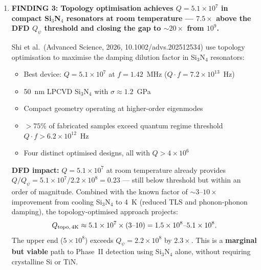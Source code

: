 \documentclass[11pt]{article}
\theoremstyle{definition}
\theoremstyle{remark}
\newcommand{\ee}[1]{\times 10^{#1}}
\newcommand{\Qpsi}{Q_\psi}
\newcommand{\caution}[1]{\textcolor{orange}{\textbf{CAUTION:} #1}}
\newcommand{\newfinding}[1]{\textcolor{teal}{\textbf{NEW FINDING:} #1}}
\begin{document}
\begin{tcolorbox}[colback=blue!5!white, colframe=blue!50!black,
  title=\textbf{W4i15 TOP 5 FINDINGS --- Ranked by Programme Impact}]
\begin{enumerate}
\newfinding{Crystalline TiN added to the materials hierarchy at
HIGH priority, between Si$_3$N$_4$ and crystalline Si. Unique
combination: ultra-high stress + crystalline + conductive.}

\caution{TiN soft-clamped PnC has NOT yet been demonstrated. The
projection of $Q > 10^9$ is based on scaling from the plain
membrane result plus established soft-clamping physics. Fabrication
of TiN PnC membranes requires e-beam lithography and RIE etching
of TiN-on-Si, which is standard in superconducting qubit
fabrication but has not been applied to nanomechanical PnC design.}

\item \textbf{FINDING 3: Topology optimisation achieves
$Q = 5.1\ee{7}$ in compact Si$_3$N$_4$ resonators at room
temperature --- $7.5\times$ above the DFD $\Qpsi$ threshold
and closing the gap to $\sim 20\times$ from $10^9$.}

Shi et al.\ (Advanced Science, 2026, 10.1002/advs.202512534)
use topology optimisation to maximise the damping dilution factor
in Si$_3$N$_4$ resonators:
\begin{itemize}[nosep]
\item Best device: $Q = 5.1\ee{7}$ at $f = 1.42$~MHz
  ($Q \cdot f = 7.2\ee{13}$~Hz)
\item 50~nm LPCVD Si$_3$N$_4$ with $\sigma \approx 1.2$~GPa
\item Compact geometry operating at higher-order eigenmodes
\item $> 75\%$ of fabricated samples exceed quantum regime
  threshold $Q \cdot f > 6.2\ee{12}$~Hz
\item Four distinct optimised designs, all with $Q > 4\ee{6}$
\end{itemize}

\textbf{DFD impact:} $Q = 5.1\ee{7}$ at room temperature
already provides $Q/\Qpsi = 5.1\ee{7}/2.2\ee{8} = 0.23$ ---
still below threshold but within an order of magnitude. Combined
with the known factor of $\sim 3$--$10\times$ improvement from
cooling Si$_3$N$_4$ to 4~K (reduced TLS and phonon-phonon
damping), the topology-optimised approach projects:
\begin{equation}
Q_{\rm topo,\,4K} \approx 5.1\ee{7} \times (3\text{--}10)
= 1.5\ee{8}\text{--}5.1\ee{8}.
\label{eq:topo_cryo}
\end{equation}
The upper end ($5\ee{8}$) exceeds $\Qpsi = 2.2\ee{8}$ by
$2.3\times$. This is a \textbf{marginal but viable} path to
Phase~II detection using Si$_3$N$_4$ alone, without requiring
crystalline Si or TiN.


\end{enumerate}
\end{tcolorbox}
\end{document}
